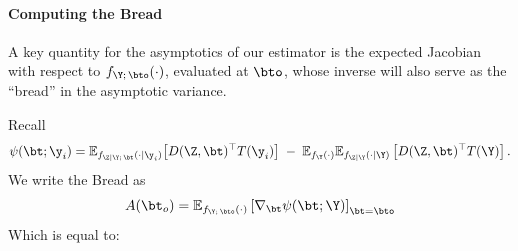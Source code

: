

\paragraph{Computing the Bread}
A key quantity for the asymptotics of our estimator is the expected Jacobian with respect to $f_{\Y;\,\bto}(\cdot)$, evaluated at $\bto$, whose inverse will also serve as the ``bread'' in the asymptotic variance.

\noindent Recall
\begin{equation}
    \psi(\bt;\y_i) 
    = \mathbb{E}_{f_{\Z|\Y;\,\bt}(\cdot\mid \y_i)}\!\left[ D(\Z,\bt)^\top T(\y_i) \right] 
    \;-\; \mathbb{E}_{f_{\Y}(\cdot)}\mathbb{E}_{f_{\Z\mid\Y}(\cdot\mid\Y)}\left[ D(\Z,\bt)^\top T(\Y)\right].
\end{equation}
%
We write the Bread as
%
\begin{equation}
    A(\bt_o) = \mathbb{E}_{f_{\Y;\,\bto}(\cdot)}\left[\nabla_\bt \psi(\bt;\Y)\right]_{\bt=\bto}
    \label{eqn:Jacobian}
\end{equation}
%
Which is equal to:


